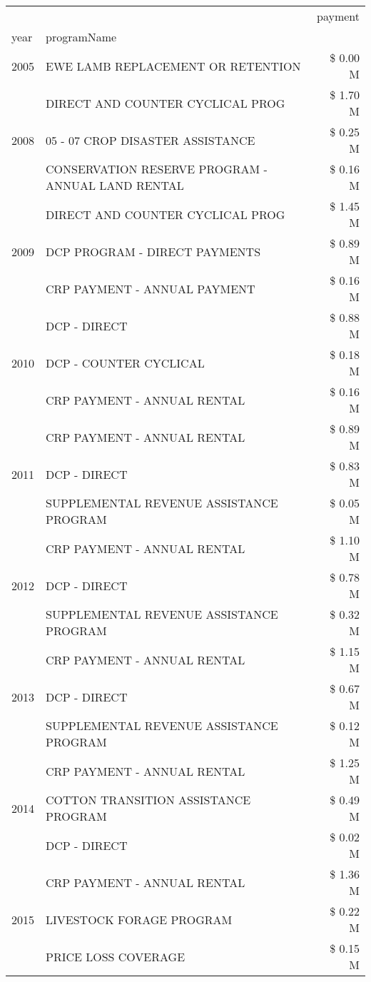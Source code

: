 \begin{tabular}{llr}
\toprule
 &  & payment \\
year & programName &  \\
\midrule
2005 & EWE LAMB REPLACEMENT OR RETENTION & \$ 0.00 M \\
\cline{1-3}
\multirow[t]{3}{*}{2008} & DIRECT AND COUNTER CYCLICAL PROG & \$ 1.70 M \\
 & 05 - 07 CROP DISASTER ASSISTANCE & \$ 0.25 M \\
 & CONSERVATION RESERVE PROGRAM - ANNUAL LAND RENTAL & \$ 0.16 M \\
\cline{1-3}
\multirow[t]{3}{*}{2009} & DIRECT AND COUNTER CYCLICAL PROG & \$ 1.45 M \\
 & DCP PROGRAM - DIRECT PAYMENTS & \$ 0.89 M \\
 & CRP PAYMENT - ANNUAL PAYMENT & \$ 0.16 M \\
\cline{1-3}
\multirow[t]{3}{*}{2010} & DCP - DIRECT & \$ 0.88 M \\
 & DCP - COUNTER CYCLICAL & \$ 0.18 M \\
 & CRP PAYMENT - ANNUAL RENTAL & \$ 0.16 M \\
\cline{1-3}
\multirow[t]{3}{*}{2011} & CRP PAYMENT - ANNUAL RENTAL & \$ 0.89 M \\
 & DCP - DIRECT & \$ 0.83 M \\
 & SUPPLEMENTAL REVENUE ASSISTANCE PROGRAM & \$ 0.05 M \\
\cline{1-3}
\multirow[t]{3}{*}{2012} & CRP PAYMENT - ANNUAL RENTAL & \$ 1.10 M \\
 & DCP - DIRECT & \$ 0.78 M \\
 & SUPPLEMENTAL REVENUE ASSISTANCE PROGRAM & \$ 0.32 M \\
\cline{1-3}
\multirow[t]{3}{*}{2013} & CRP PAYMENT - ANNUAL RENTAL & \$ 1.15 M \\
 & DCP - DIRECT & \$ 0.67 M \\
 & SUPPLEMENTAL REVENUE ASSISTANCE PROGRAM & \$ 0.12 M \\
\cline{1-3}
\multirow[t]{3}{*}{2014} & CRP PAYMENT - ANNUAL RENTAL & \$ 1.25 M \\
 & COTTON TRANSITION ASSISTANCE PROGRAM & \$ 0.49 M \\
 & DCP - DIRECT & \$ 0.02 M \\
\cline{1-3}
\multirow[t]{3}{*}{2015} & CRP PAYMENT - ANNUAL RENTAL & \$ 1.36 M \\
 & LIVESTOCK FORAGE PROGRAM & \$ 0.22 M \\
 & PRICE LOSS COVERAGE & \$ 0.15 M \\

\end{tabular}
